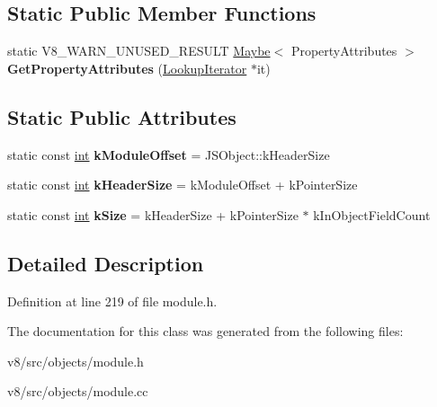 \subsection*{Static Public Member Functions}
\begin{DoxyCompactItemize}
\item 
\mbox{\label{classv8_1_1internal_1_1JSModuleNamespace_a60e7d9136b014406012065d05232b59d}} 
static V8\+\_\+\+W\+A\+R\+N\+\_\+\+U\+N\+U\+S\+E\+D\+\_\+\+R\+E\+S\+U\+LT \mbox{\hyperlink{classv8_1_1Maybe}{Maybe}}$<$ Property\+Attributes $>$ {\bfseries Get\+Property\+Attributes} (\mbox{\hyperlink{classv8_1_1internal_1_1LookupIterator}{Lookup\+Iterator}} $\ast$it)
\end{DoxyCompactItemize}
\subsection*{Static Public Attributes}
\begin{DoxyCompactItemize}
\item 
\mbox{\label{classv8_1_1internal_1_1JSModuleNamespace_a41e9a9d00aabdc0cb71b087d5e880244}} 
static const \mbox{\hyperlink{classint}{int}} {\bfseries k\+Module\+Offset} = J\+S\+Object\+::k\+Header\+Size
\item 
\mbox{\label{classv8_1_1internal_1_1JSModuleNamespace_a387b3767e015b5b9909d42014b13d73d}} 
static const \mbox{\hyperlink{classint}{int}} {\bfseries k\+Header\+Size} = k\+Module\+Offset + k\+Pointer\+Size
\item 
\mbox{\label{classv8_1_1internal_1_1JSModuleNamespace_ab47f75699391fc460ed31969c99c3914}} 
static const \mbox{\hyperlink{classint}{int}} {\bfseries k\+Size} = k\+Header\+Size + k\+Pointer\+Size $\ast$ k\+In\+Object\+Field\+Count
\end{DoxyCompactItemize}


\subsection{Detailed Description}


Definition at line 219 of file module.\+h.



The documentation for this class was generated from the following files\+:\begin{DoxyCompactItemize}
\item 
v8/src/objects/module.\+h\item 
v8/src/objects/module.\+cc\end{DoxyCompactItemize}
